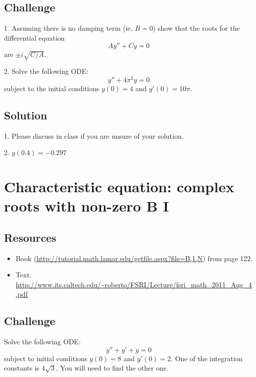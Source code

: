 \subsection*{Challenge}
1. Assuming there is no damping term (ie, $B=0$) show that the roots for the differential equation
\begin{equation}
    A y'' + Cy = 0
\end{equation}
are $\pm i \sqrt{C/A}$.

2. Solve the following ODE:
\begin{equation}
    \label{eq:cecr}
    y'' + 4 \pi^2 y = 0
\end{equation}
subject to the initial conditions $y(0)=4$ and $y'(0)=10 \pi$.

\subsection*{Solution}
1. Please discuss in class if you are unsure of your solution.

2. $y(0.4)=-0.297$




\newpage
\section{Characteristic equation: complex roots with non-zero B I}

\subsection*{Resources}
\begin{itemize}
    \item Book (\url{http://tutorial.math.lamar.edu/getfile.aspx?file=B,1,N}) from page 122.
    \item Text: \url{http://www.its.caltech.edu/~roberto/FSRI/Lecture/fsri_math_2011_Aug_4.pdf}
\end{itemize}

\subsection*{Challenge}
Solve the following ODE:
\begin{equation}
    y'' + y' + y = 0
\end{equation}
subject to initial conditions $y(0)=8$ and $y'(0)=2$. One of the integration constants is $4 \sqrt{3}$. You will need to find the other one.

